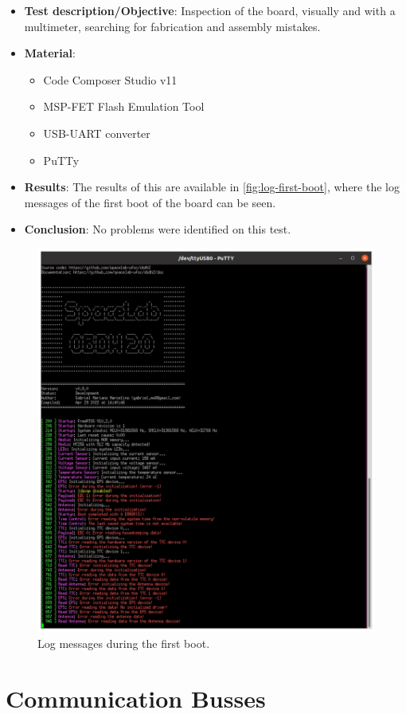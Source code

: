 \begin{itemize}
    \item \textbf{Test description/Objective}: Inspection of the board, visually and with a multimeter, searching for fabrication and assembly mistakes.
    \item \textbf{Material}:
        \begin{itemize}
            \item Code Composer Studio v11
            \item MSP-FET Flash Emulation Tool
            \item USB-UART converter
            \item PuTTy
        \end{itemize}
    \item \textbf{Results}: The results of this are available in \autoref{fig:log-first-boot}, where the log messages of the first boot of the board can be seen.
    \item \textbf{Conclusion}: No problems were identified on this test.
\end{itemize}

\begin{figure}[!ht]
    \begin{center}
        \includegraphics[width=0.7\columnwidth]{figures/v07/obdh2-boot.png}
        \caption{Log messages during the first boot.}
        \label{fig:log-first-boot}
    \end{center}
\end{figure}

\section{Communication Busses}

